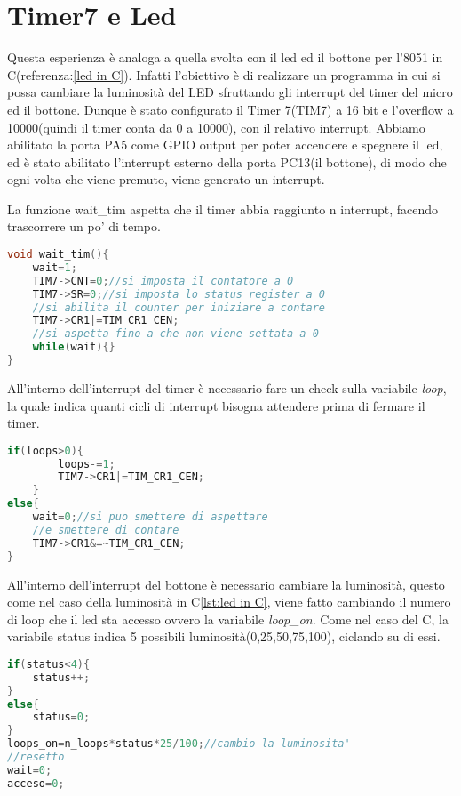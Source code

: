 \documentclass[main.tex]{subfiles}
\begin{document}
\section{Timer7 e Led}
Questa esperienza è analoga a quella svolta con il led ed il bottone per l'8051 in C(referenza:\ref{led in C}). Infatti l'obiettivo è di realizzare un programma in cui si possa cambiare la luminosità del LED sfruttando gli interrupt del timer del micro ed il bottone. Dunque è stato configurato il Timer 7(TIM7) a 16 bit e l'overflow a 10000(quindi il timer conta da 0 a 10000), con il relativo interrupt. Abbiamo abilitato la porta PA5 come GPIO output per poter accendere e spegnere il led, ed è stato abilitato l'interrupt esterno della porta PC13(il bottone), di modo che ogni volta che viene premuto, viene generato un interrupt.

La funzione wait\_tim aspetta che il timer abbia raggiunto n interrupt, facendo trascorrere un po' di tempo.
\begin{lstlisting}[language=C, caption=Funzione wait\_tim per aspettare]
void wait_tim(){
	wait=1;
	TIM7->CNT=0;//si imposta il contatore a 0
	TIM7->SR=0;//si imposta lo status register a 0
	//si abilita il counter per iniziare a contare
	TIM7->CR1|=TIM_CR1_CEN;
	//si aspetta fino a che non viene settata a 0
	while(wait){}
}
\end{lstlisting}
All'interno dell'interrupt del timer è necessario fare un check sulla variabile \textit{loop}, la quale indica quanti cicli di interrupt bisogna attendere prima di fermare il timer.  
\begin{lstlisting}[language=C, caption=Gestione dell'interrupt del timer]
if(loops>0){
		loops-=1;
		TIM7->CR1|=TIM_CR1_CEN;
	}
else{
	wait=0;//si puo smettere di aspettare
	//e smettere di contare
	TIM7->CR1&=~TIM_CR1_CEN;
}
\end{lstlisting}

All'interno dell'interrupt del bottone è necessario cambiare la luminosità, questo come nel caso della luminosità in C\ref{lst:led in C}, viene fatto cambiando il numero di loop che il led sta accesso ovvero la variabile \textit{loop\_on}. Come nel caso del C, la variabile status indica 5 possibili luminosità(0,25,50,75,100), ciclando su di essi.
\begin{lstlisting}[language=C, caption=Gestione interrupt del bottone]
if(status<4){
	status++;
}
else{
	status=0;
}
loops_on=n_loops*status*25/100;//cambio la luminosita'
//resetto
wait=0;
acceso=0;
\end{lstlisting}
\end{document}

